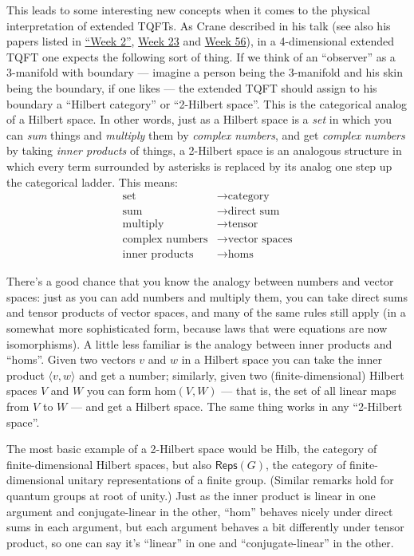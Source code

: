 \documentclass{article}
\begin{document}
This leads to some interesting new concepts when it comes to the
physical interpretation of extended TQFTs. As Crane described in his
talk (see also his papers listed in \protect\hyperlink{week2}{``Week
2''}, \protect\hyperlink{week23}{Week 23} and
\protect\hyperlink{week56}{Week 56}), in a 4-dimensional extended TQFT
one expects the following sort of thing. If we think of an ``observer''
as a 3-manifold with boundary --- imagine a person being the 3-manifold
and his skin being the boundary, if one likes --- the extended TQFT
should assign to his boundary a ``Hilbert category'' or ``2-Hilbert
space''. This is the categorical analog of a Hilbert space. In other
words, just as a Hilbert space is a \emph{set} in which you can
\emph{sum} things and \emph{multiply} them by \emph{complex numbers},
and get \emph{complex numbers} by taking \emph{inner products} of
things, a 2-Hilbert space is an analogous structure in which every term
surrounded by asterisks is replaced by its analog one step up the
categorical ladder. This means: \[
  \begin{aligned}
    \text{set} &\to \text{category}
  \\\text{sum} &\to \text{direct sum}
  \\\text{multiply} &\to \text{tensor}
  \\\text{complex numbers} &\to \text{vector spaces}
  \\\text{inner products} &\to \text{homs}
  \end{aligned}
\]

There's a good chance that you know the analogy between numbers and
vector spaces: just as you can add numbers and multiply them, you can
take direct sums and tensor products of vector spaces, and many of the
same rules still apply (in a somewhat more sophisticated form, because
laws that were equations are now isomorphisms). A little less familiar
is the analogy between inner products and ``homs''. Given two vectors
\(v\) and \(w\) in a Hilbert space you can take the inner product
\(\langle v,w\rangle\) and get a number; similarly, given two
(finite-dimensional) Hilbert spaces \(V\) and \(W\) you can form
\(\mathrm{hom}(V,W)\) --- that is, the set of all linear maps from \(V\)
to \(W\) --- and get a Hilbert space. The same thing works in any
``2-Hilbert space''.

The most basic example of a 2-Hilbert space would be Hilb, the category
of finite-dimensional Hilbert spaces, but also \(\mathsf{Reps}(G)\), the
category of finite-dimensional unitary representations of a finite
group. (Similar remarks hold for quantum groups at root of unity.) Just
as the inner product is linear in one argument and conjugate-linear in
the other, ``\(\mathrm{hom}\)'' behaves nicely under direct sums in each
argument, but each argument behaves a bit differently under tensor
product, so one can say it's ``linear'' in one and ``conjugate-linear''
in the other.
\end{document}
